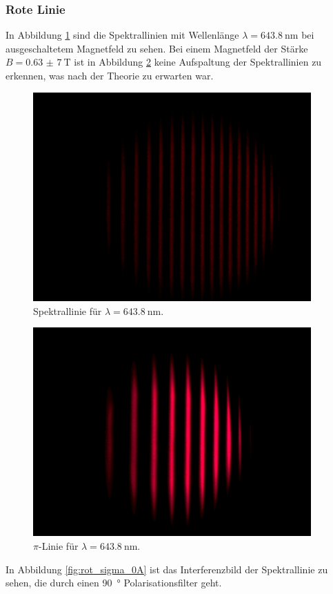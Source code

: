 \subsubsection{Rote Linie}
In Abbildung \ref{fig:rot_pi_0A} sind die Spektrallinien mit Wellenlänge $\lambda=\SI{643,8}{\nano\meter}$ bei ausgeschaltetem Magnetfeld zu sehen.
Bei einem Magnetfeld der Stärke $B=\SI{0,63(7)}{\tesla}$ ist in Abbildung \ref{fig:rot_pi_10A} keine Aufspaltung der Spektrallinien zu erkennen, was nach der Theorie zu erwarten war.
\begin{figure}[htb]
  \centering
  \includegraphics[height=8cm]{content/pictures/rot_pi_0A.png}
  \caption{Spektrallinie für $\lambda=\SI{643,8}{\nano\meter}$.}
  \label{fig:rot_pi_0A}
\end{figure}
\begin{figure}[htb]
  \centering
  \includegraphics[height=8cm]{content/pictures/rot_pi_10A.png}
  \caption{$\pi$-Linie für $\lambda=\SI{643,8}{\nano\meter}$.}
  \label{fig:rot_pi_10A}
\end{figure}
In Abbildung \ref{fig:rot_sigma_0A} ist das Interferenzbild der Spektrallinie zu sehen, die durch einen \SI{90}{\degree} Polarisationsfilter geht.
